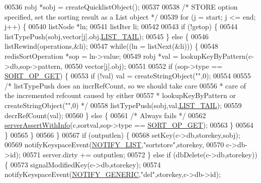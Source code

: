\begin{DoxyCode}
00536         robj *sobj = createQuicklistObject();
00537 
00538         \textcolor{comment}{/* STORE option specified, set the sorting result as a List object */}
00539         \textcolor{keywordflow}{for} (j = start; j <= end; j++) \{
00540             listNode *ln;
00541             listIter li;
00542 
00543             \textcolor{keywordflow}{if} (!getop) \{
00544                 listTypePush(sobj,vector[j].obj,\hyperlink{server_8h_a745de98bef5b645df56479181803235b}{LIST\_TAIL});
00545             \} \textcolor{keywordflow}{else} \{
00546                 listRewind(operations,&li);
00547                 \textcolor{keywordflow}{while}((ln = listNext(&li))) \{
00548                     redisSortOperation *sop = ln->value;
00549                     robj *val = lookupKeyByPattern(c->db,sop->pattern,
00550                         vector[j].obj);
00551 
00552                     \textcolor{keywordflow}{if} (sop->type == \hyperlink{server_8h_ae9b61d5c032be6ac2f29076ee43cef8b}{SORT\_OP\_GET}) \{
00553                         \textcolor{keywordflow}{if} (!val) val = createStringObject(\textcolor{stringliteral}{""},0);
00554 
00555                         \textcolor{comment}{/* listTypePush does an incrRefCount, so we should take care}
00556 \textcolor{comment}{                         * care of the incremented refcount caused by either}
00557 \textcolor{comment}{                         * lookupKeyByPattern or createStringObject("",0) */}
00558                         listTypePush(sobj,val,\hyperlink{server_8h_a745de98bef5b645df56479181803235b}{LIST\_TAIL});
00559                         decrRefCount(val);
00560                     \} \textcolor{keywordflow}{else} \{
00561                         \textcolor{comment}{/* Always fails */}
00562                         \hyperlink{server_8h_a7308f76cbff9a8d3797fe78190b91282}{serverAssertWithInfo}(c,sortval,sop->type == 
      \hyperlink{server_8h_ae9b61d5c032be6ac2f29076ee43cef8b}{SORT\_OP\_GET});
00563                     \}
00564                 \}
00565             \}
00566         \}
00567         \textcolor{keywordflow}{if} (outputlen) \{
00568             setKey(c->db,storekey,sobj);
00569             notifyKeyspaceEvent(\hyperlink{server_8h_a1c0b64c84b0e66dff3554ffe3e2ec4c8}{NOTIFY\_LIST},\textcolor{stringliteral}{"sortstore"},storekey,
00570                                 c->db->id);
00571             server.dirty += outputlen;
00572         \} \textcolor{keywordflow}{else} \textcolor{keywordflow}{if} (dbDelete(c->db,storekey)) \{
00573             signalModifiedKey(c->db,storekey);
00574             notifyKeyspaceEvent(\hyperlink{server_8h_a9fa53dd1068e62365f3964ad3479eec2}{NOTIFY\_GENERIC},\textcolor{stringliteral}{"del"},storekey,c->db->id);

\end{DoxyCode}
